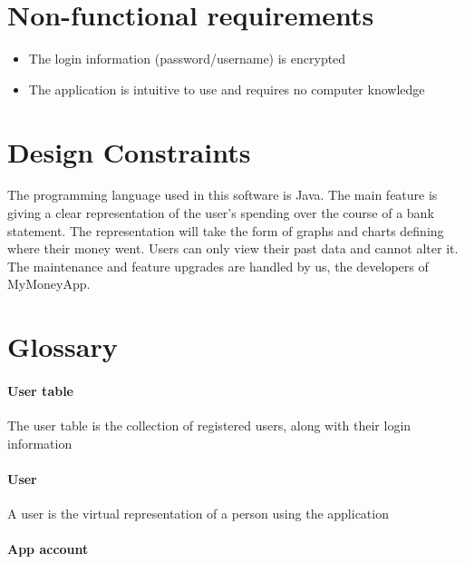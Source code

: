 \documentclass[letterpaper]{article}
\begin{document}
\newpage	

\section{Non-functional requirements}

	\begin{itemize}
		
		\item The login information (password/username) is encrypted 
		
		\item The application is intuitive to use and requires no computer knowledge
		
	\end{itemize}

\section{Design Constraints}

	The programming language used in this software is Java. The main feature is giving a clear representation of the user’s spending over the course of a bank statement. The representation will take the form of graphs and charts defining where their money went. Users can only view their past data and cannot alter it. The maintenance and feature upgrades are handled by us, the developers of MyMoneyApp.

\newpage

\section{Glossary}

	\paragraph{User table}
	
		The user table is the collection of registered users, along with their login information
	
	\paragraph{User}
	
		A user is the virtual representation of a person using the application
	
	\paragraph{App account}
	
\end{document}
